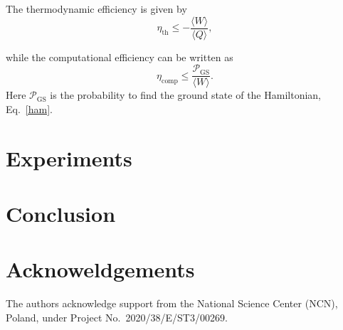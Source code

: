\documentclass[%
 reprint,
 amsmath,amssymb,
 aps,
]{revtex4-2}
\begin{document}
The thermodynamic efficiency is given by 
\begin{equation}
    \eta_{\text{th}} \leq - \frac{ \langle W \rangle}{ \langle Q \rangle},
\end{equation}

while the computational efficiency can be written as
\begin{equation}
    \eta_{\text{comp}} \leq  \frac{ \mathcal{P}_\text{GS}}{ \langle W \rangle}.
\end{equation}
Here $\mathcal{P}_\text{GS}$ is the probability to find the ground state of the Hamiltonian, Eq.~\eqref{ham}.

\section{\label{Experiments} Experiments}

\section{\label{conclusion} Conclusion}

\section*{Acknoweldgements}
The authors acknowledge support from the National Science Center (NCN), Poland, under Project No.~2020/38/E/ST3/00269.



\end{document}
